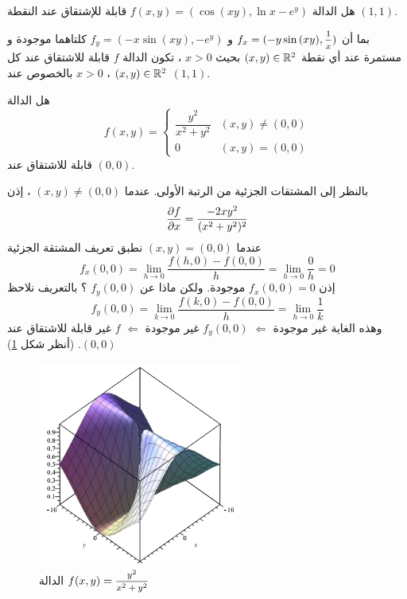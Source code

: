\begin{example}
    هل الدالة $f(x,y)=(\cos{(xy)},\ln{x}-e^y)$ قابلة للإشتقاق عند النقطة $(1,1)$.
\end{example}
\begin{solution}
    بما أن $f_x=(-y\sin{(xy)},\mfrac{1}{x})$ و $f_y=(-x\sin{(xy)},-e^y)$ كلتاهما موجودة و مستمرة عند أي نقطة $(x,y)\in\mathbb{R}^2$ بحيث $x>0$ ، تكون الدالة $f$ قابلة للاشتقاق عند كل $(x,y)\in\mathbb{R}^2$ ، $x>0$ بالخصوص عند $(1,1)$.
\end{solution}

\begin{example}
    هل الدالة 
    \[
    f(x,y)=\begin{cases}
        \dfrac{y^2}{x^2+y^2}&(x,y)\neq(0,0)\\
        0 & (x,y)=(0,0)
    \end{cases}
    \]
    قابلة للاشتقاق عند $(0,0)$.
\end{example}
\begin{solution}
    بالنظر إلى المشتقات الجزئية من الرتبة الأولى. عندما $(x,y)\neq(0,0)$ ، إذن
    \[
    \dfrac{\partial f}{\partial x}=\frac{-2xy^2}{(x^2+y^2)^2}
    \]
    عندما $(x,y)=(0,0)$ نطبق تعريف المشتقة الجزئية 
    \[
    f_x(0,0)=\lim\limits_{h\to0}\frac{f(h,0)-f(0,0)}{h}=\lim\limits_{h\to0}\frac{0}{h}=0
    \]
    إذن $f_x(0,0)=0$ موجودة. ولكن ماذا عن $f_y(0,0)$ ؟ بالتعريف نلاحظ
\[
f_y(0,0)=\lim\limits_{k\to0}\frac{f(k,0)-f(0,0)}{h}=\lim\limits_{h\to0}\frac{1}{k}
\]
وهذه الغاية غير موجودة $\Leftarrow$ $f_y(0,0)$ غير موجودة $\Leftarrow$ $f$ غير قابلة للاشتقاق عند $(0,0)$. (أنظر شكل \ref{fig:y2_x2y2})
\end{solution}
\begin{figure}[ht]
    \centering
    \includegraphics[width=0.6\textwidth]{plots/function4.png}
    \caption{الدالة $f(x,y)=\mfrac{y^2}{x^2+y^2}$}
    \label{fig:y2_x2y2}
\end{figure}

